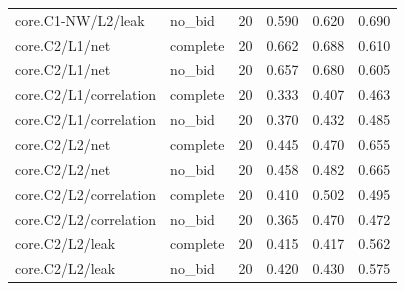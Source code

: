 \begin{longtable}{@{}p{2.2in}lrrrr@{}}
core.\allowbreak C1-NW/\allowbreak L2/\allowbreak leak & no\_\allowbreak bid & 20 & 0.590 & 0.620 & 0.690\\
core.\allowbreak C2/\allowbreak L1/\allowbreak net & complete & 20 & 0.662 & 0.688 & 0.610\\
core.\allowbreak C2/\allowbreak L1/\allowbreak net & no\_\allowbreak bid & 20 & 0.657 & 0.680 & 0.605\\
core.\allowbreak C2/\allowbreak L1/\allowbreak correlation & complete & 20 & 0.333 & 0.407 & 0.463\\
core.\allowbreak C2/\allowbreak L1/\allowbreak correlation & no\_\allowbreak bid & 20 & 0.370 & 0.432 & 0.485\\
core.\allowbreak C2/\allowbreak L2/\allowbreak net & complete & 20 & 0.445 & 0.470 & 0.655\\
core.\allowbreak C2/\allowbreak L2/\allowbreak net & no\_\allowbreak bid & 20 & 0.458 & 0.482 & 0.665\\
core.\allowbreak C2/\allowbreak L2/\allowbreak correlation & complete & 20 & 0.410 & 0.502 & 0.495\\
core.\allowbreak C2/\allowbreak L2/\allowbreak correlation & no\_\allowbreak bid & 20 & 0.365 & 0.470 & 0.472\\
core.\allowbreak C2/\allowbreak L2/\allowbreak leak & complete & 20 & 0.415 & 0.417 & 0.562\\
core.\allowbreak C2/\allowbreak L2/\allowbreak leak & no\_\allowbreak bid & 20 & 0.420 & 0.430 & 0.575\\

\end{longtable}
